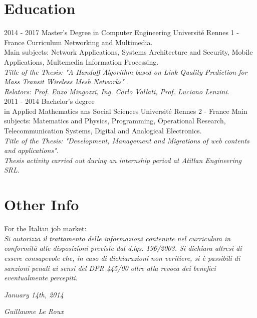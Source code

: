 \documentclass[]{friggeri-cv}
\begin{document}
\section{Education}
\begin{entrylist}
	\entry
	{2014 - 2017}
	{Master's Degree in Computer Engineering}
	{Université Rennes 1 - France}
	{Curriculum Networking and Multimedia.\\
	Main subjects: Network Applications, Systems Architecture and Security, Mobile Applications, Multemedia Information            Processing.\\
	\emph{Title of the Thesis: "A Handoff Algorithm based on Link Quality Prediction for Mass Transit Wireless Mesh Networks"      .}\\
	\emph{Relators: Prof. Enzo Mingozzi, Ing. Carlo Vallati, Prof. Luciano Lenzini.}\\}
	\entry
	{2011 - 2014}
	{ Bachelor's degree \\in Applied Mathematics ans Social Sciences }
	{Université Rennes 2 - France}
	{Main subjects: Matematics and Physics, Programming, Operational Research, Telecommunication Systems, Digital and Analogical Electronics.\\
	\emph{Title of the Thesis: "Development, Management and Migrations of web contents and applications".}\\
	\emph{Thesis activity carried out during an internship period at Atitlan Engineering SRL.}\\}
\end{entrylist}


\section{Other Info}
For the Italian job market:\\
\emph{Si autorizza il trattamento delle informazioni contenute nel curriculum in conformità alle disposizioni previste dal d.lgs. 196/2003. Si dichiara altresì di essere consapevole che, in caso di dichiarazioni non veritiere, si è passibili di sanzioni penali ai sensi del DPR 445/00 oltre alla revoca dei benefici eventualmente percepiti.}
\\
\begin{flushleft}
	\emph{January 14th, 2014}
\end{flushleft}
\begin{flushright}
	\emph{Guillaume Le Roux}
\end{flushright}
\end{document}
